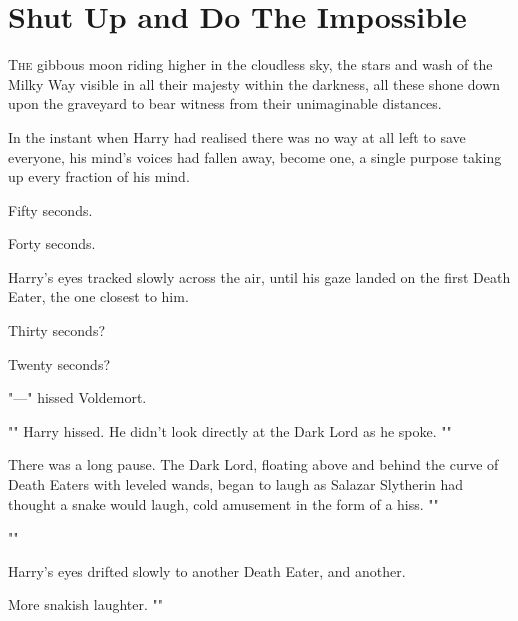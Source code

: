 \chapter{Shut Up and Do The Impossible}

\lettrine{T}{he} gibbous moon
riding higher in the cloudless sky, the stars and wash of the Milky Way visible
in all their majesty within the darkness, all these shone down upon the
graveyard to bear witness from their unimaginable distances.

In the instant when Harry had realised there was no way at all left to save
everyone, his mind's voices had fallen away, become one, a single purpose
taking up every fraction of his mind.

Fifty seconds.

Forty seconds.

Harry's eyes tracked slowly across the air, until his gaze landed on the first
Death Eater, the one closest to him.

Thirty seconds?

Twenty seconds?

"—" hissed Voldemort.

"" Harry hissed. He didn't
look directly at the Dark Lord as he spoke. ""

There was a long pause. The Dark Lord, floating above and behind the curve of
Death Eaters with leveled wands, began to laugh as Salazar Slytherin had
thought a snake would laugh, cold amusement in the form of a hiss. ""

""

Harry's eyes drifted slowly to another Death Eater, and another.

More snakish laughter. ""


